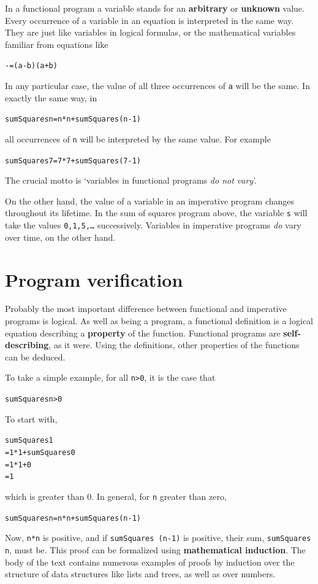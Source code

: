 In a functional program a variable stands for an \textbf{arbitrary} or \textbf{
unknown} value. Every occurrence of a variable in an equation is interpreted
in the same way. They are  just like variables in logical formulas,
or the mathematical variables familiar from
equations like
\begin{alltt}
 -  = (a-b)(a+b)
\end{alltt}
In any particular case, the value of all three occurrences of \texttt{a} will be
the same. In exactly the same way, in
\begin{alltt}
sumSquares n = n*n + sumSquares (n-1)
\end{alltt}
all occurrences of \texttt{n} will be interpreted by the same value. For example
\begin{alltt}
sumSquares 7 = 7*7 + sumSquares (7-1)
\end{alltt}
The crucial motto is `variables in functional programs {\em do not vary}'.

On the other hand, the value of a variable in an imperative
program changes throughout its lifetime. In the sum of squares program above,
the variable \texttt{s} will take the values \texttt{0,1,5,\ldots} successively.
Variables in imperative programs {\em do\/} vary over time, on the other hand.

\section*{Program verification}
\vspace{-6pt}

Probably the most important difference between functional and imperative
programs is logical. 
As well as being a program, a functional definition is a logical equation
describing a \textbf{property} of the function. Functional
programs are \textbf{self-describing}, as it were. Using the definitions, other
properties of the functions can be deduced. 

To take a simple example, for all
\texttt{n>0}, it is the case that 
\begin{alltt}
sumSquares n > 0
\end{alltt}
To start with,
\begin{alltt}
sumSquares 1 
= 1*1 + sumSquares 0
= 1*1 + 0
= 1
\end{alltt}
which is greater than 0. In general, for \texttt{n} greater than zero,
\begin{alltt}
sumSquares n = n*n + sumSquares (n-1)
\end{alltt}
Now, \texttt{n*n} is positive, and if \texttt{sumSquares (n-1)} is positive,
their sum, \texttt{sumSquares n}, must be. This proof can be formalized using
\textbf{mathematical induction}. The body
of the text contains numerous examples of proofs by induction over the
structure of data structures like lists and trees, as well as over
numbers.

